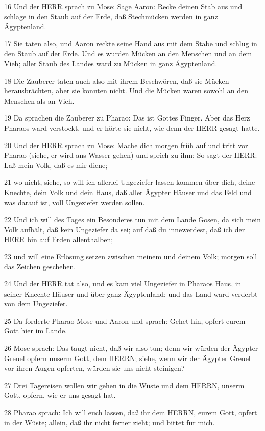 \par 16 Und der HERR sprach zu Mose: Sage Aaron: Recke deinen Stab aus und schlage in den Staub auf der Erde, daß Stechmücken werden in ganz Ägyptenland.
\par 17 Sie taten also, und Aaron reckte seine Hand aus mit dem Stabe und schlug in den Staub auf der Erde. Und es wurden Mücken an den Menschen und an dem Vieh; aller Staub des Landes ward zu Mücken in ganz Ägyptenland.
\par 18 Die Zauberer taten auch also mit ihrem Beschwören, daß sie Mücken herausbrächten, aber sie konnten nicht. Und die Mücken waren sowohl an den Menschen als an Vieh.
\par 19 Da sprachen die Zauberer zu Pharao: Das ist Gottes Finger. Aber das Herz Pharaos ward verstockt, und er hörte sie nicht, wie denn der HERR gesagt hatte.
\par 20 Und der HERR sprach zu Mose: Mache dich morgen früh auf und tritt vor Pharao (siehe, er wird ans Wasser gehen) und sprich zu ihm: So sagt der HERR: Laß mein Volk, daß es mir diene;
\par 21 wo nicht, siehe, so will ich allerlei Ungeziefer lassen kommen über dich, deine Knechte, dein Volk und dein Haus, daß aller Ägypter Häuser und das Feld und was darauf ist, voll Ungeziefer werden sollen.
\par 22 Und ich will des Tages ein Besonderes tun mit dem Lande Gosen, da sich mein Volk aufhält, daß kein Ungeziefer da sei; auf daß du innewerdest, daß ich der HERR bin auf Erden allenthalben;
\par 23 und will eine Erlösung setzen zwischen meinem und deinem Volk; morgen soll das Zeichen geschehen.
\par 24 Und der HERR tat also, und es kam viel Ungeziefer in Pharaos Haus, in seiner Knechte Häuser und über ganz Ägyptenland; und das Land ward verderbt von dem Ungeziefer.
\par 25 Da forderte Pharao Mose und Aaron und sprach: Gehet hin, opfert eurem Gott hier im Lande.
\par 26 Mose sprach: Das taugt nicht, daß wir also tun; denn wir würden der Ägypter Greuel opfern unserm Gott, dem HERRN; siehe, wenn wir der Ägypter Greuel vor ihren Augen opferten, würden sie uns nicht steinigen?
\par 27 Drei Tagereisen wollen wir gehen in die Wüste und dem HERRN, unserm Gott, opfern, wie er uns gesagt hat.
\par 28 Pharao sprach: Ich will euch lassen, daß ihr dem HERRN, eurem Gott, opfert in der Wüste; allein, daß ihr nicht ferner zieht; und bittet für mich.
